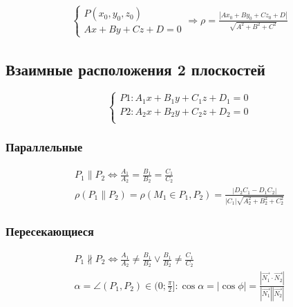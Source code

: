 \documentclass{article}
\begin{document}
\begin{gather*}
	\begin{cases}
		P(x_0, y_0, z_0) \\
		Ax + By + Cz + D = 0
	\end{cases} \Rightarrow
	\rho = \frac{|Ax_0 + By_0 + Cz_0 + D|}{\sqrt{A^2 + B^2 + C^2}}
\end{gather*}

\subsection{Взаимные расположения 2 плоскостей}

\[
\begin{cases}
	P1 : A_1x + B_1y + C_1z + D_1 = 0 \\
	P2 : A_2x + B_2y + C_2z + D_2 = 0 \\
\end{cases}
\]

\subsubsection{Параллельные}

\begin{gather*}
	P_1 \parallel P_2 \Leftrightarrow \frac{A_1}{A_2} =
	\frac{B_1}{B_2} = \frac{C_1}{C_2} \\
	\rho(P_1 \parallel P_2) = \rho(M_1 \in P_1, P_2) =
	\frac{|D_2 C_1 - D_1 C_2|}{|C_1| \sqrt{A_2^2 + B_2^2 + C_2^2}}
\end{gather*}

\subsubsection{Пересекающиеся}

\begin{gather*}
	P_1 \not \parallel P_2 \Leftrightarrow
	\frac{A_1}{A_2} \ne \frac{B_1}{B_2} \lor \frac{B_1}{B_2} \ne \frac{C_1}{C_2} \\
	\alpha = \angle(P_1, P_2) \in (0; \frac{\pi}{2}] :
	\cos \alpha = |\cos \phi| = \frac{|\vec{N_1} \cdot \vec{N_2}|}{|\vec{N_1}| |\vec{N_2}|}
\end{gather*}
\end{document}
